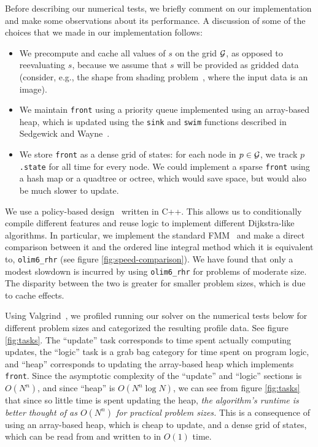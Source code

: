 \documentclass[smallcondensed]{svjour3}
\begin{document}
Before describing our numerical tests, we briefly comment on our
implementation and make some observations about its performance. A
discussion of some of the choices that we made in our implementation
follows:
\begin{itemize}
\item We precompute and cache all values of $s$ on the grid $\mathcal{G}$,
  as opposed to reevaluating $s$, because we assume that $s$ will be
  provided as gridded data (consider, e.g., the shape from shading
  problem~\cite{kimmel2001optimal}, where the input data is an image).
\item We maintain \texttt{front} using a priority queue implemented
  using an array-based heap, which is updated using the \texttt{sink}
  and \texttt{swim} functions described in Sedgewick and
  Wayne~\cite{sedgewick2011algorithms}.
\item We store \texttt{front} as a dense grid of states: for each node
  in $p \in \mathcal{G}$, we track $p$\texttt{.state} for all time for every
  node. We could implement a sparse \texttt{front} using a hash map or
  a quadtree or octree, which would save space, but would also be much
  slower to update.
\end{itemize}

We use a policy-based design~\cite{alexandrescu2001modern} written in
C++. This allows us to conditionally compile different features and
reuse logic to implement different Dijkstra-like algorithms. In
particular, we implement the standard FMM~\cite{sethian1996fast} and
make a direct comparison between it and the ordered line integral
method which it is equivalent to, \texttt{olim6\_rhr} (see figure
\ref{fig:speed-comparison}). We have found that only a modest slowdown
is incurred by using \texttt{olim6\_rhr} for problems of moderate
size. The disparity between the two is greater for smaller problem
sizes, which is due to cache effects.

Using Valgrind~\cite{nethercote2007valgrind}, we profiled running our
solver on the numerical tests below for different problem sizes and
categorized the resulting profile data. See figure
\ref{fig:tasks}. The ``update'' task corresponds to time spent
actually computing updates, the ``logic'' task is a grab bag category
for time spent on program logic, and ``heap'' corresponds to updating
the array-based heap which implements \texttt{front}. Since the
asymptotic complexity of the ``update'' and ``logic'' sections is
$O(N^n)$, and since ``heap'' is $O(N^n \log N)$, we can see from
figure \ref{fig:tasks} that since so little time is spent updating the
heap, \emph{the algorithm's runtime is better thought of as $O(N^n)$
  for practical problem sizes.} This is a consequence of using an
array-based heap, which is cheap to update, and a dense grid of
states, which can be read from and written to in $O(1)$ time.
\end{document}
